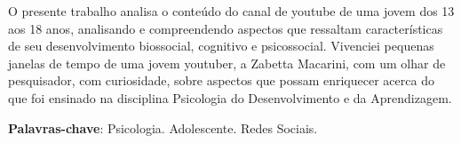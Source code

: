 
\setlength{\absparsep}{18pt} %
\begin{resumo}
 O presente trabalho analisa o conteúdo do canal de youtube de uma jovem dos 13 aos 18 anos, analisando e compreendendo aspectos que ressaltam características  de seu desenvolvimento biossocial, cognitivo e psicossocial. Vivenciei pequenas janelas de tempo de uma jovem youtuber, a Zabetta Macarini, com um olhar de pesquisador, com curiosidade, sobre aspectos que possam enriquecer acerca do que foi ensinado na disciplina Psicologia do Desenvolvimento e da Aprendizagem.

 \textbf{Palavras-chave}: Psicologia. Adolescente. Redes Sociais.
\end{resumo}
